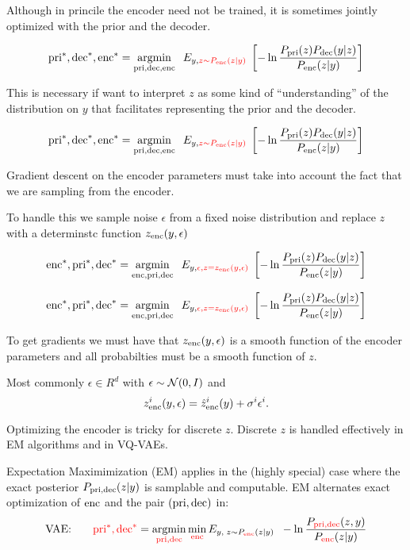{

Although in princile the encoder need not be trained, it is sometimes jointly optimized with the prior and the decoder.

\vfill
$$\mathrm{pri}^*,\mathrm{dec}^*,\mathrm{enc}^* = \operatorname*{argmin}_{\mathrm{pri},\mathrm{dec},\mathrm{enc}}\;\;E_{y,{\color{red} z\sim P_{\mathrm{enc}}(z|y)}}\;\left[- \ln \frac{P_{\mathrm{pri}}(z)P_{\mathrm{dec}}(y|z)}{P_{\mathrm{enc}}(z|y)}\right]$$

\vfill
This is necessary if want to interpret $z$ as some kind of ``understanding'' of the distribution on $y$ that facilitates representing the prior and the decoder.


$$\mathrm{pri}^*,\mathrm{dec}^*,\mathrm{enc}^* = \operatorname*{argmin}_{\mathrm{pri},\mathrm{dec},\mathrm{enc}}\;\;E_{y,{\color{red} z\sim P_{\mathrm{enc}}(z|y)}}\;\left[- \ln \frac{P_{\mathrm{pri}}(z)P_{\mathrm{dec}}(y|z)}{P_{\mathrm{enc}}(z|y)}\right]$$

\vfill
Gradient descent on the encoder parameters must take into account the fact that we are sampling from the encoder.

\vfill
To handle this we sample noise $\epsilon$ from a fixed noise distribution and replace $z$ with a determinstc function $z_{\mathrm{enc}}(y,\epsilon)$

\vfill
$$\mathrm{enc}^*,\mathrm{pri}^*,\mathrm{dec}^* = \operatorname*{argmin}_{\mathrm{enc},\mathrm{pri},\mathrm{dec}}\;\;E_{y,{\color{red} \epsilon,z=z_{\mathrm{enc}}(y,\epsilon)}}\;\left[- \ln \frac{P_{\mathrm{pri}}(z)P_{\mathrm{dec}}(y|z)}{P_{\mathrm{enc}}(z|y)}\right]$$


$$\mathrm{enc}^*,\mathrm{pri}^*,\mathrm{dec}^* = \operatorname*{argmin}_{\mathrm{enc},\mathrm{pri},\mathrm{dec}}\;\;E_{y,{\color{red} \epsilon,z=z_{\mathrm{enc}}(y,\epsilon)}}\;\left[- \ln \frac{P_{\mathrm{pri}}(z)P_{\mathrm{dec}}(y|z)}{P_{\mathrm{enc}}(z|y)}\right]$$

\vfill
To get gradients we must have that $z_{\mathrm{enc}}(y,\epsilon)$ is a smooth function of the encoder parameters and all probabilties must be a smooth function of $z$.

\vfill
Most commonly $\epsilon \in R^d$ with $\epsilon \sim {\cal N}(0,I)$ and
$$z^i_{\mathrm{enc}}(y,\epsilon) = \hat{z}^i_{\mathrm{enc}}(y) + \sigma^i\epsilon^i.$$

\vfill
Optimizing the encoder is tricky for discrete $z$.  Discrete $z$ is handled effectively in EM algorithms and in VQ-VAEs.


Expectation Maximimization (EM) applies in the (highly special) case where the exact posterior $P_{\mathrm{pri},\mathrm{dec}}(z|y)$ is samplable and computable.
EM alternates exact optimization of $\mathrm{enc}$ and the pair $(\mathrm{pri},\mathrm{dec})$ in:
$$\mbox{VAE:}\;\;\;\;\;\;\; {\color{red} \mathrm{pri}^*,\mathrm{dec}^*} = \operatorname*{argmin}_{\color{red} \mathrm{pri},\mathrm{dec}} \min_{\color{red} \mathrm{enc}} E_{y,\;z \sim P_{\color{red} \mathrm{enc}}(z|y)}\;\;- \ln \frac{P_{\color{red} \mathrm{pri},\mathrm{dec}}(z,y)}{P_{\color{red} \mathrm{enc}}(z|y)}$$

}
